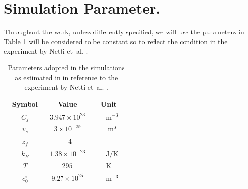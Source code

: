 \documentclass[runningheads]{llncs}
\begin{document}
\section{Simulation Parameter.}
\label{para}
Throughout the work, unless differently specified, we will use the parameters in Table \ref{Tab1} will be considered to be constant so to reflect the condition in the experiment by Netti et~al. \cite{Netti,ecm2}.
\begin{table}[h!]
	\vspace{4mm}
	\centering
	\begin{tabular}{||c c c||}
		\hline\addlinespace[2pt]
		Symbol  & Value& Unit\\
		\hline\addlinespace[5pt]
		$\qquad C_f\qquad$  & $3.947\times 10^{23}$& $\qquad\text{m}^{-3}\quad$\\
		$\qquad v_s\qquad$  & $3\times 10^{-29}$& $\qquad\text{m}^3\quad$ \\
		$\qquad z_f\qquad$ & $-4$& -\\
		$\qquad k_B\qquad$ & $1.38 \times 10^{-23}$& $\qquad\text{J}/\text{K}\quad$\\
		$\qquad T\qquad$ &$295$ &K\\
		$\qquad c^i_0\qquad$ & $9.27\times 10^{25}$& $\qquad\text{m}^{-3}\quad$\\
		\hline
	\end{tabular}
	\vspace{2mm}
	\caption{Parameters adopted in the simulations as estimated in \cite{ecm2} in reference to the experiment by Netti et~al. \cite{Netti}.}
	\label{Tab1}
\end{table}
\end{document}
